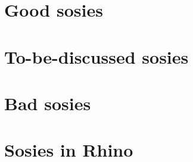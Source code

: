 \documentclass[table]{sig-alternate}
\title{}
\author{}
\begin{document}
\maketitle
\section{Good sosies}








\section{To-be-discussed sosies}


\section{Bad sosies}
\section{Sosies in Rhino}







% 
% 
\end{document}
